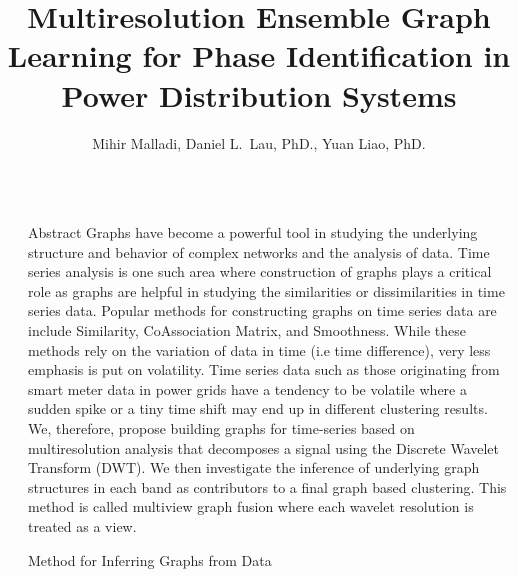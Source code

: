 \documentclass[final]{beamer}
\title{Multiresolution Ensemble  Graph
Learning for Phase Identification in Power
Distribution Systems}
\author{Mihir Malladi, Daniel L.~Lau, PhD., Yuan Liao, PhD.}
\newlength{\sepwidth}
\newlength{\colwidth}
\newcommand{\separatorcolumn}{\begin{column}{\sepwidth}\end{column}}
\begin{document}
\begin{frame}[t]
\begin{columns}[t]
\separatorcolumn

\begin{column}{\colwidth}

  \begin{block}{Abstract}
Graphs have become a powerful tool in studying the underlying structure and behavior of complex networks and the analysis of data. Time series analysis is one such area where construction of graphs plays a critical role as graphs are helpful in studying the similarities or dissimilarities in time series data. Popular methods for constructing graphs on time series data are include Similarity, CoAssociation Matrix, and Smoothness. While these methods rely on the variation of data in time (i.e time difference), very less emphasis is put on volatility. Time series data such as those originating from smart meter data in power grids have a tendency to be volatile where a sudden spike or a tiny time shift may end up in different clustering results. We, therefore, propose building graphs for time-series based on multiresolution analysis that decomposes a signal using the Discrete Wavelet Transform (DWT). We then investigate the inference of underlying graph structures in each band as contributors to a final graph based clustering. This method is called multiview graph fusion where each wavelet resolution is treated as a view.

    

  \end{block}

  

  \begin{block}{Method for Inferring Graphs from Data}
 

\end{block}
\end{column}
\end{columns}
\end{frame}
\end{document}
